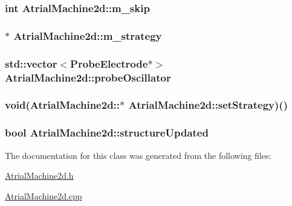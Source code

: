 \hypertarget{class_atrial_machine2d_a08a7d022fbd6733e52775651b5f139dc}{
\subsubsection[{m\+\_\+skip}]{\setlength{\rightskip}{0pt plus 5cm}int Atrial\+Machine2d\+::m\+\_\+skip}}\label{class_atrial_machine2d_a08a7d022fbd6733e52775651b5f139dc}
\hypertarget{class_atrial_machine2d_afa218ce1cafcf45895c0317953b97977}{
\subsubsection[{m\+\_\+strategy}]{$\ast$ Atrial\+Machine2d\+::m\+\_\+strategy}}\label{class_atrial_machine2d_afa218ce1cafcf45895c0317953b97977}
\hypertarget{class_atrial_machine2d_a524fc9fd5d07a9f6f93611ee7839c99c}{
\subsubsection[{probe\+Oscillator}]{\setlength{\rightskip}{0pt plus 5cm}std\+::vector$<${\bf Probe\+Electrode}$\ast$$>$ Atrial\+Machine2d\+::probe\+Oscillator}}\label{class_atrial_machine2d_a524fc9fd5d07a9f6f93611ee7839c99c}
\hypertarget{class_atrial_machine2d_aaeb0690b1fbd433bd0c25f2162b7b4bb}{
\subsubsection[{set\+Strategy}]{\setlength{\rightskip}{0pt plus 5cm}void(Atrial\+Machine2d\+::$\ast$ Atrial\+Machine2d\+::set\+Strategy)()}}\label{class_atrial_machine2d_aaeb0690b1fbd433bd0c25f2162b7b4bb}
\hypertarget{class_atrial_machine2d_a9d4b451c3384c6cac71bd06662e30b55}{
\subsubsection[{structure\+Updated}]{\setlength{\rightskip}{0pt plus 5cm}bool Atrial\+Machine2d\+::structure\+Updated}}\label{class_atrial_machine2d_a9d4b451c3384c6cac71bd06662e30b55}


The documentation for this class was generated from the following files\+:\begin{DoxyCompactItemize}
\item 
\hyperlink{_atrial_machine2d_8h}{Atrial\+Machine2d.\+h}\item 
\hyperlink{_atrial_machine2d_8cpp}{Atrial\+Machine2d.\+cpp}\end{DoxyCompactItemize}
